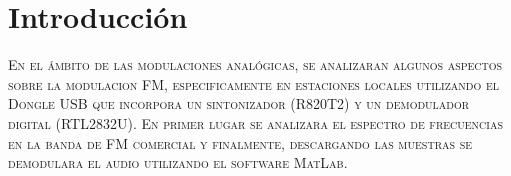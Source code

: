 \section*{Introducción}
\lettrine[lines=2,findent=4pt,nindent=0pt]{E}{\normalfont n el ámbito de las modulaciones analógicas, se analizaran algunos aspectos sobre la modulacion FM, especificamente en estaciones locales utilizando el Dongle USB que incorpora un sintonizador (R820T2) y un demodulador digital (RTL2832U). En primer lugar se analizara el espectro de frecuencias en la banda de FM comercial y finalmente, descargando las muestras se demodulara el audio utilizando el software MatLab.}